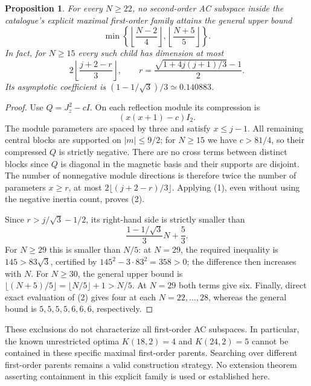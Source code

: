 \documentclass[11pt]{article}
\newtheorem{proposition}{Proposition}
\begin{document}
\begin{proposition}
For every $N\ge22$, no second-order AC subspace inside the catalogue's
explicit maximal first-order family attains the general upper bound
\[
 \min\left\{\left\lfloor\frac{N-2}{4}\right\rfloor,
             \left\lfloor\frac{N+5}{5}\right\rfloor\right\}.
\]
In fact, for $N\ge15$ every such child has dimension at most
\[
 2\left\lfloor\frac{j+2-r}{3}\right\rfloor,
 \qquad r=\frac{\sqrt{1+4j(j+1)/3}-1}{2}.
 \tag{2}
\]
Its asymptotic coefficient is $(1-1/\sqrt3)/3\simeq0.140883$.
\end{proposition}
\begin{proof}
Use $Q=J_z^2-cI$. On each reflection module its compression is
\[
 (x(x+1)-c)I_2.
\]
The module parameters are spaced by three and satisfy $x\le j-1$.
All remaining central blocks are supported on $|m|\le9/2$; for $N\ge15$
we have $c>81/4$, so their compressed $Q$ is strictly negative.
There are no cross terms between distinct blocks since $Q$ is diagonal
in the magnetic basis and their supports are disjoint.
The number of nonnegative module directions is therefore twice the
number of parameters $x\ge r$, at most
$2\lfloor(j+2-r)/3\rfloor$. Applying (1), even without using the negative
inertia count, proves (2).

Since $r>j/\sqrt3-1/2$, its right-hand side is strictly smaller than
\[
 \frac{1-1/\sqrt3}{3}N+\frac53.
\]
For $N\ge29$ this is smaller than $N/5$: at $N=29$, the required
inequality is $145>83\sqrt3$, certified by
$145^2-3\cdot83^2=358>0$; the difference then increases with $N$.
For $N\ge30$, the general upper bound is
$\lfloor(N+5)/5\rfloor=\lfloor N/5\rfloor+1>N/5$.
At $N=29$ both terms give six. Finally, direct exact evaluation of (2)
gives four at each $N=22,\ldots,28$, whereas the general bound is
$5,5,5,5,6,6,6$, respectively.
\end{proof}

These exclusions do not characterize all first-order AC subspaces.
In particular, the known unrestricted optima $K(18,2)=4$ and $K(24,2)=5$
cannot be contained in these specific maximal first-order parents.
Searching over different first-order parents remains a valid construction
strategy. No extension theorem asserting containment in this explicit
family is used or established here.
\end{document}
